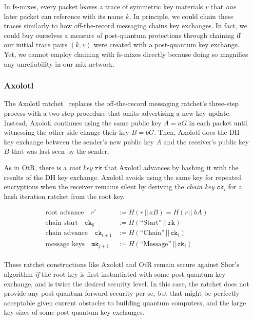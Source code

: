 \documentclass[twoside,letterpaper]{llncs}
\def\mathcomma{}
\begin{document}
In fs-mixes, every packet leaves a trace of symmetric
key materials $v$ that {\it one} later packet can reference with its
name $k$.  In principle, we could chain these traces similarly to
how off-the-record messaging \cite{OtR} chains key exchanges.
In fact, we could buy ourselves a measure of post-quantum protections
through chaining if our initial trace pairs $(k,v)$ were created with
a post-quantum key exchange.  Yet, we cannot employ chaining with
fs-mixes directly because doing so magnifies any unreliability in
our mix network. 

\subsubsection{Axolotl}
\def\ck{\texttt{ck}}
\def\rk{\texttt{rk}}
\def\mk{\texttt{mk}}

The Axolotl ratchet~\cite{TextSecure} replaces the off-the-record
messaging ratchet's three-step process with a two-step procedure
that omits advertising a new key update.  Instead, Axolotl continues
using the same public key $A = a G$ in each packet until witnessing
the other side change their key $B = b G$.  Then, Axolotl does the DH key
exchange between the sender's new public key $A$ and the receiver's
public key $B$ that was last seen by the sender.

As in OtR, there is a {\it root key} $\rk$ that Axolotl advances by
hashing it with the results of the DH key exchange.  Axolotl avoids using the same key for
repeated encryptions when the receiver remains silent by deriving the
{\it chain key} $\ck_i$ for a hash iteration ratchet from the root key.

\[ \begin{aligned}
\textrm{root advance}\quad
r' &:= H(r \,||\, a B) = H(r \,||\, b A) \\ %
\textrm{chain start}\quad
 \ck_0 &:= H(\textrm{``Start''} \,||\, \rk) \\
\textrm{chain advance}\quad
 \ck_{i+1} &:= H(\textrm{``Chain''} \,||\, \ck_i)  \\
\textrm{message keys}\quad
 \mk_{j+1} &:= H(\textrm{``Message''} \,||\, \ck_i)  \\
\end{aligned} \]

These ratchet constructions like Axolotl and OtR remain secure against
Shor's algorithm {\it if} the root key is first instantiated with some
post-quantum key exchange, and is twice the desired security level. 
In this case, the ratchet does not provide any post-quantum forward
security per se, but that might be perfectly acceptable given current
obstacles to building quantum computers, and the large key sizes of
some post-quantum key exchanges. 
\end{document}
